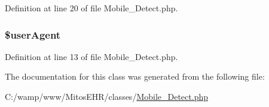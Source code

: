 \-Definition at line 20 of file \-Mobile\-\_\-\-Detect.\-php.

\hypertarget{class_mobile___detect_a500e55626e728acd7010143dc0e56b8b}{
\subsubsection[{\$user\-Agent}]{\setlength{\rightskip}{0pt plus 5cm}\$user\-Agent}}\label{class_mobile___detect_a500e55626e728acd7010143dc0e56b8b}


\-Definition at line 13 of file \-Mobile\-\_\-\-Detect.\-php.



\-The documentation for this class was generated from the following file\-:\begin{DoxyCompactItemize}
\item 
\-C\-:/wamp/www/\-Mitos\-E\-H\-R/classes/\hyperlink{_mobile___detect_8php}{\-Mobile\-\_\-\-Detect.\-php}\end{DoxyCompactItemize}
